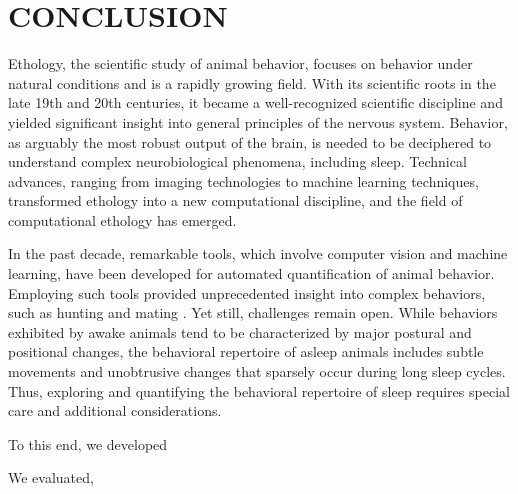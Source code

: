 \setlength{\parindent}{0pt}
\chapter{\bf CONCLUSION}\label{chapter:conclusion}

Ethology, the scientific study of animal behavior, focuses on behavior under natural conditions and is a rapidly growing field.
With its scientific roots in the late 19th and 20th centuries, it became a well-recognized scientific discipline and yielded significant insight into general principles of the nervous system.
Behavior, as arguably the most robust output of the brain, is needed to be deciphered to understand complex neurobiological phenomena, including sleep.
Technical advances, ranging from imaging technologies to machine learning techniques, transformed ethology into a new computational discipline, and the field of computational ethology has emerged.

In the past decade, remarkable tools, which involve computer vision and machine learning, have been developed for automated quantification of animal behavior.
Employing such tools provided unprecedented insight into complex behaviors, such as hunting and mating \citep{mearns_deconstructing_2020, janisch_deciphering_2021}.
Yet still, challenges remain open.
While behaviors exhibited by awake animals tend to be characterized by major postural and positional changes, the behavioral repertoire of asleep animals includes subtle movements and unobtrusive changes that sparsely occur during long sleep cycles.
Thus, exploring and quantifying the behavioral repertoire of sleep requires special care and additional considerations.

To this end, we developed

We evaluated,




